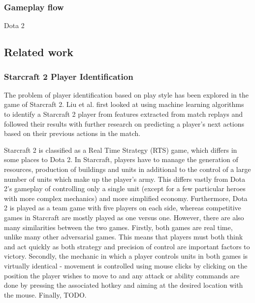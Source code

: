 \documentclass[Report.tex]{subfiles}
\begin{document}
\subsubsection{Gameplay flow}



Dota 2

\subsection{Related work}

\subsubsection{Starcraft 2 Player Identification}
The problem of player identification based on play style has been explored in the game of Starcraft 2. Liu et al. \cite{starcraft-identification} first looked at using machine learning algorithms to identify a Starcraft 2 player from features extracted from match replays and followed their results with further research \cite{starcraft-actions} on predicting a player's next actions based on their previous actions in the match. 

Starcraft 2 is classified as a Real Time Strategy (RTS) game, which differs in some places to Dota 2. In Starcraft, players have to manage the generation of resources, production of buildings and units in additional to the control of a large number of units which make up the player's army. This differs vastly from Dota 2's gameplay of controlling only a single unit (except for a few particular heroes with more complex mechanics) and more simplified economy. Furthermore, Dota 2 is played as a team game with five players on each side, whereas competitive games in Starcraft are mostly played as one versus one. However, there are also many similarities between the two games. Firstly, both games are real time, unlike many other adversarial games. This means that players must both think and act quickly as both strategy and precision of control are important factors to victory. Secondly, the mechanic in which a player controls units in both games is virtually identical - movement is controlled using mouse clicks by clicking on the position the player wishes to move to and any attack or ability commands are done by pressing the associated hotkey and aiming at the desired location with the mouse. Finally, TODO.
\end{document}
